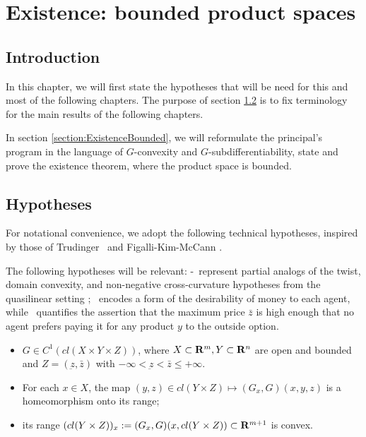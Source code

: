\chapter{Existence: bounded product spaces}\label{chapter:existence_bounded}

\section{Introduction}


	In this chapter, we will first state the hypotheses that will be need for this and most of the following chapters. The purpose of section \ref{section:Hypotheses} is to fix terminology for the main results of the following chapters.\medskip
	
	In section \ref{section:ExistenceBounded}, we will reformulate the principal's program in the language of $G$-convexity and $G$-subdifferentiability, state and prove the existence theorem, where the product space is bounded.  \medskip



\section{Hypotheses}\label{section:Hypotheses}

For notational convenience, we adopt the following technical hypotheses, inspired by those of 
Trudinger~\cite{Trudinger14} and Figalli-Kim-McCann \cite{FigalliKimMcCann11}. 

The following hypotheses will be relevant:  \Gone-\Gthree\ represent partial analogs of the twist, domain convexity,
and non-negative cross-curvature hypotheses from the quasilinear setting \cite{FigalliKimMcCann11} \cite{Loeper09};
\Gfour\ encodes a form of the desirability of money to each agent, while \Gfive\ quantifies the assertion that the maximum
price $\bar z$ is high enough that no agent prefers paying it for any product $y$ to the outside option.

\begin{itemize}
	\item[\Gzero] $G \in C^{1}(cl(X\times Y \times Z))$, where $X\subset {\mathbf R}^m, Y \subset {\mathbf R}^n$ are open and bounded and $Z=(\underbar z,\bar z)$ with $-\infty <\underbar z < \bar z \le +\infty$.
	
	\item[\Gone] For each $x \in X$, the map $(y,z) \in cl( Y \times Z) \longmapsto (G_x, G)(x,y,z)$ is a homeomorphism onto its range;
	
	\item[\Gtwo] its range $(cl( Y \times Z))_x := (G_x,G)(x,cl(Y \times Z)) \subset {\mathbf R}^{m+1}$ is convex.
\end{itemize}

